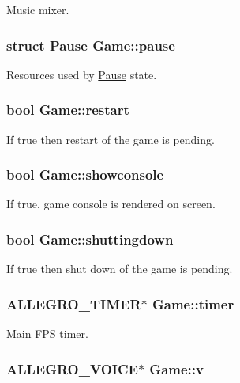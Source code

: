 \-Music mixer. \hypertarget{structGame_a3fe420d2d9b47cbdbb26d4f68bb5a0f0}{
\subsubsection[{pause}]{\setlength{\rightskip}{0pt plus 5cm}struct {\bf \-Pause} {\bf \-Game\-::pause}}}\label{structGame_a3fe420d2d9b47cbdbb26d4f68bb5a0f0}
\-Resources used by \hyperlink{structPause}{\-Pause} state. \hypertarget{structGame_aad2035c807bd99529d1a07e443e0016b}{
\subsubsection[{restart}]{\setlength{\rightskip}{0pt plus 5cm}bool {\bf \-Game\-::restart}}}\label{structGame_aad2035c807bd99529d1a07e443e0016b}
\-If true then restart of the game is pending. \hypertarget{structGame_ab1dafa4ce0c3526439418ac24bf616d8}{
\subsubsection[{showconsole}]{\setlength{\rightskip}{0pt plus 5cm}bool {\bf \-Game\-::showconsole}}}\label{structGame_ab1dafa4ce0c3526439418ac24bf616d8}
\-If true, game console is rendered on screen. \hypertarget{structGame_a9a1d33be7ec00f87ede16b96bd2df312}{
\subsubsection[{shuttingdown}]{\setlength{\rightskip}{0pt plus 5cm}bool {\bf \-Game\-::shuttingdown}}}\label{structGame_a9a1d33be7ec00f87ede16b96bd2df312}
\-If true then shut down of the game is pending. \hypertarget{structGame_a8d6d4f06c6412d085112cd007977d868}{
\subsubsection[{timer}]{\setlength{\rightskip}{0pt plus 5cm}\-A\-L\-L\-E\-G\-R\-O\-\_\-\-T\-I\-M\-E\-R$\ast$ {\bf \-Game\-::timer}}}\label{structGame_a8d6d4f06c6412d085112cd007977d868}
\-Main \-F\-P\-S timer. \hypertarget{structGame_ab27cb95bcd1591fec45317a1e9f5062d}{
\subsubsection[{v}]{\setlength{\rightskip}{0pt plus 5cm}\-A\-L\-L\-E\-G\-R\-O\-\_\-\-V\-O\-I\-C\-E$\ast$ {\bf \-Game\-::v}}}\label{structGame_ab27cb95bcd1591fec45317a1e9f5062d}
